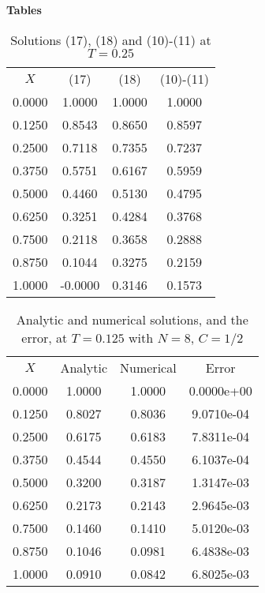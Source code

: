 \documentclass[12pt]{extarticle}
\begin{document}
\pagebreak 

\textbf{Tables}

\begin{table}[htp!]
\caption{Solutions (17), (18) and (10)-(11) at $T = 0.25$}
\centering
\begin{tabular}{cccc}
\\
$X$ & (17) & (18) & (10)-(11) \\ [0.5ex]
0.0000 & 1.0000 & 1.0000 & 1.0000 \\ 
0.1250 & 0.8543 & 0.8650 & 0.8597 \\ 
0.2500 & 0.7118 & 0.7355 & 0.7237 \\ 
0.3750 & 0.5751 & 0.6167 & 0.5959 \\ 
0.5000 & 0.4460 & 0.5130 & 0.4795 \\ 
0.6250 & 0.3251 & 0.4284 & 0.3768 \\ 
0.7500 & 0.2118 & 0.3658 & 0.2888 \\ 
0.8750 & 0.1044 & 0.3275 & 0.2159 \\ 
1.0000 & -0.0000 & 0.3146 & 0.1573 \\ 
\end{tabular}
\label{table:1}
\end{table}

\begin{table}[htp!]
\caption{Analytic and numerical solutions, and the error, at $T=0.125$ with $N=8$, $C=1/2$ }
\centering
\begin{tabular}{cccc}
\\
$X$ & Analytic & Numerical & Error \\ [0.5ex]
0.0000 & 1.0000 & 1.0000 & 0.0000e+00 \\ 
0.1250 & 0.8027 & 0.8036 & 9.0710e-04 \\ 
0.2500 & 0.6175 & 0.6183 & 7.8311e-04 \\ 
0.3750 & 0.4544 & 0.4550 & 6.1037e-04 \\ 
0.5000 & 0.3200 & 0.3187 & 1.3147e-03 \\ 
0.6250 & 0.2173 & 0.2143 & 2.9645e-03 \\ 
0.7500 & 0.1460 & 0.1410 & 5.0120e-03 \\ 
0.8750 & 0.1046 & 0.0981 & 6.4838e-03 \\ 
1.0000 & 0.0910 & 0.0842 & 6.8025e-03 \\ 
\end{tabular}
\label{table:2}
\end{table}
\end{document}

